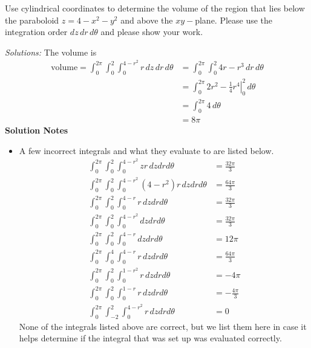 \fi



\ifnum {}

    \question[4] Use cylindrical coordinates to determine the volume of the region that lies below the paraboloid $z =4 -x^2 - y^2$ and above the $xy-$plane. Please use the integration order $dz \, dr \, d\theta $ and please show your work. 
    
    \ifnum {} 
    {\color{DarkBlue} \textit{Solutions:}
    The volume is
    \begin{align}
        \text{volume}=\int_{0}^{2\pi}\int_{0}^{2} \int_0^{4 - r^2} r \, dz \, dr \, d\theta 
        &= \int_{0}^{2\pi}\int_{0}^{2} 4r - r^3  \, dr \, d\theta \\
        &= \int_{0}^{2\pi} \left. 2r^2 - \frac14r^4 \right|_0^2 \, d\theta \\
        &= \int_{0}^{2\pi} 4 \, d\theta \\
        &= 8\pi 
    \end{align}
    \textbf{Solution Notes}
    \begin{itemize}
        \item A few incorrect integrals and what they evaluate to are listed below. 
        \begin{align}
            \int_0^{2\pi} \int_0^2 \int_0^{4-r^2} zr \, dz dr d\theta &= \frac{32\pi}{3} \\
            \int_0^{2\pi} \int_0^2 \int_0^{4-r^2} (4-r^2) r \, dz dr d\theta &= \frac{64\pi}{3} \\
            \int_0^{2\pi} \int_0^2 \int_0^{4-r} r \, dz dr d\theta &= \frac{32\pi}{3} \\
            \int_0^{2\pi} \int_0^2 \int_0^{4-r^2} dz dr d\theta &= \frac{32\pi}{3} \\
            \int_0^{2\pi} \int_0^2 \int_0^{4-r} dz dr d\theta &= 12\pi \\
            \int_0^{2\pi} \int_0^4 \int_0^{4-r} r \, dz dr d\theta &= \frac{64\pi}{3} \\
            \int_0^{2\pi} \int_0^2 \int_0^{1-r^2} r \, dz dr d\theta &= -4\pi \\
            \int_0^{2\pi} \int_0^2 \int_0^{1-r} r \, dz dr d\theta &= - \frac{4\pi}{3} \\
            \int_0^{2\pi} \int_{-2}^2 \int_0^{4-r^2} r \, dz dr d\theta &= 0 
        \end{align}
        None of the integrals listed above are correct, but we list them here in case it helps determine if the integral that was set up was evaluated correctly. 
    \end{itemize}
    
    }
    \else

